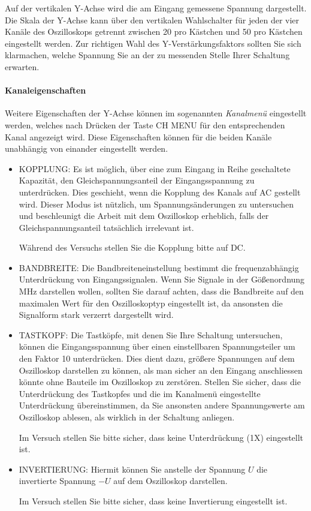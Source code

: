   Auf der vertikalen Y-Achse wird die am Eingang gemessene Spannung dargestellt. Die Skala der Y-Achse kann über den vertikalen Wahlschalter für jeden der vier Kanäle des Oszilloskops getrennt zwischen \unit{20}{\milli\volt} pro Kästchen und \unit{50}{\volt} pro Kästchen eingestellt werden. Zur richtigen Wahl des Y-Verstärkungsfaktors sollten Sie sich klarmachen, welche Spannung Sie an der zu messenden Stelle Ihrer Schaltung erwarten. 

  \paragraph{Kanaleigenschaften}
  Weitere Eigenschaften der Y-Achse können im sogenannten \textit{Kanalmenü} eingestellt werden, welches nach Drücken der Taste CH MENU für den entsprechenden Kanal angezeigt wird. Diese Eigenschaften können für die beiden Kanäle unabhängig von einander eingestellt werden. 
  \begin{itemize}
    \item KOPPLUNG: Es ist möglich, über eine zum Eingang in Reihe geschaltete Kapazität, den Gleichspannungsanteil der Eingangsspannung zu unterdrücken. Dies geschieht, wenn die Kopplung des Kanals auf AC gestellt wird. Dieser Modus ist nützlich, um Spannungsänderungen zu untersuchen und beschleunigt die Arbeit mit dem Oszilloskop erheblich,
      falls der Gleichspannungsanteil tats\"achlich irrelevant ist.
      \begin{important}
        Während des Versuchs stellen Sie die Kopplung bitte auf DC.
      \end{important}

    \item BANDBREITE: Die Bandbreiteneinstellung bestimmt die frequenzabhängig Unterdrückung von Eingangssignalen. Wenn Sie Signale in der Gößenordnung MHz darstellen wollen, sollten Sie darauf achten, dass die Bandbreite auf den maximalen Wert für den Oszilloskoptyp eingestellt ist, da ansonsten die Signalform stark verzerrt dargestellt wird.
    \item TASTKOPF: Die Tastköpfe, mit denen Sie Ihre Schaltung untersuchen, können die Eingangsspannung über einen einstellbaren Spannungsteiler um den Faktor 10 unterdrücken. Dies dient dazu, größere Spannungen auf dem Oszilloskop darstellen zu können, als man sicher an den Eingang anschliessen könnte ohne Bauteile im Oszilloskop zu zerstören. 
    Stellen Sie sicher, dass die Unterdrückung des Tastkopfes und die im Kanalmenü eingestellte Unterdrückung übereinstimmen, da Sie ansonsten andere Spannungswerte am Oszilloskop ablesen, als wirklich in der Schaltung anliegen.
			\begin{important}
				Im Versuch stellen Sie bitte sicher, dass keine Unterdrückung (1X) eingestellt ist.
			\end{important}
    \item INVERTIERUNG: Hiermit können Sie anstelle der Spannung $U$ die invertierte Spannung $-U$ auf dem Oszilloskop darstellen. 
			\begin{important}
				Im Versuch stellen Sie bitte sicher, dass keine Invertierung eingestellt ist.
			\end{important}
  \end{itemize}

